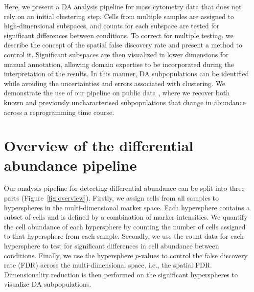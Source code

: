 \documentclass{article}
\begin{document}

Here, we present a DA analysis pipeline for mass cytometry data that does not rely on an initial clustering step.
Cells from multiple samples are assigned to high-dimensional subspaces, and counts for each subspace are tested for significant differences between conditions.
To correct for multiple testing, we describe the concept of the spatial false discovery rate and present a method to control it.
Significant subspaces are then visualized in lower dimensions for manual annotation, allowing domain expertise to be incorporated during the interpretation of the results.
In this manner, DA subpopulations can be identified while avoiding the uncertainties and errors associated with clustering.
We demonstrate the use of our pipeline on public data \cite{zunder2015continuous}, where we recover both known and previously uncharacterised subpopulations that change in abundance across a reprogramming time course.

\section{Overview of the differential abundance pipeline}
Our analysis pipeline for detecting differential abundance can be split into three parts (Figure~\ref{fig:overview}). 
Firstly, we assign cells from all samples to hyperspheres in the multi-dimensional marker space.
Each hypersphere contains a subset of cells and is defined by a combination of marker intensities.
We quantify the cell abundance of each hypersphere by counting the number of cells assigned to that hypersphere from each sample.
Secondly, we use the count data for each hypersphere to test for significant differences in cell abundance between conditions.
Finally, we use the hypersphere $p$-values to control the false discovery rate (FDR) across the multi-dimensional space, i.e., the spatial FDR.
Dimensionality reduction is then performed on the significant hyperspheres to visualize DA subpopulations.
\end{document}
